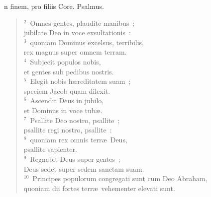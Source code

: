 \bchapter
{}n finem, pro filiis Core. Psalmus.
\begin{flushleft}\begin{verse}\vspace{6pt}${}^{2}$~Omnes gentes, plaudite manibus~;\\ jubilate Deo in voce exsultationis~:\\
${}^{3}$~quoniam Dominus excelsus, terribilis,\\ rex magnus super omnem terram.\\
${}^{4}$~Subjecit populos nobis,\\ et gentes sub pedibus nostris.\\
${}^{5}$~Elegit nobis h\ae reditatem suam~;\\ speciem Jacob quam dilexit.\\
${}^{6}$~Ascendit Deus in jubilo,\\ et Dominus in voce tub\ae .\\
${}^{7}$~Psallite Deo nostro, psallite~;\\ psallite regi nostro, psallite~:\\
${}^{8}$~quoniam rex omnis terr\ae\ Deus,\\ psallite sapienter.\\
${}^{9}$~Regnabit Deus super gentes~;\\ Deus sedet super sedem sanctam suam.\\
${}^{10}$~Principes populorum congregati sunt cum Deo Abraham,\\ quoniam dii fortes terr\ae\ vehementer elevati sunt.\end{verse}\end{flushleft}



